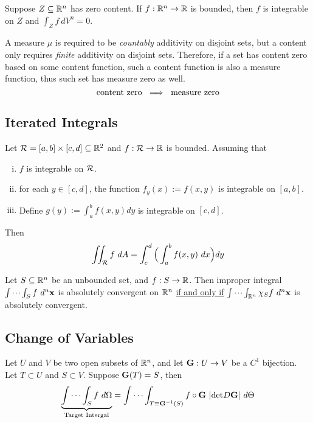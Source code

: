 \documentclass[11pt]{article}
\newcommand{\veG}[0]{\ve{G}}
\begin{document}
			\begin{proposition}[Folland 4.22]
				Suppose $Z \subseteq \mathbb{R}^n$ has zero content. If $f: \mathbb{R}^n \to \mathbb{R}$ is bounded, then $f$ is integrable on $Z$ and $\int_Z f\ dV^n = 0$.
			\end{proposition}
			
			\begin{remark}
				A measure $\mu$ is required to be \emph{countably} additivity on disjoint sets, but a content only requires \emph{finite} additivity on disjoint sets. Therefore, if a set has content zero based on some content function, such a content function is also a measure function, thus such set has measure zero as well.
				\begin{equation}
					\text{{content zero }} \implies \text{{ measure zero}}
				\end{equation}
			\end{remark}
			
		\subsection{Iterated Integrals}
			\begin{theorem}
				Let $\mathcal{{R}} = [a,b] \times [c,d] \subseteq \mathbb{R}^2$ and $f: \mathcal{{R}} \to \mathbb{R}$ is bounded. Assuming that
				\begin{enumerate}[(i)]
					\item $f$ is integrable on $\mathcal{{R}}$.
					\item for each $y \in [c,d]$, the function $f_y(x) := f(x,y)$ is integrable on $[a,b]$.
					\item Define $g(y) := \int_a^b f(x, y) dy$ is integrable on $[c,d]$.
				\end{enumerate}
				Then 
				\begin{equation}
					\iint_{\mathcal{{R}}} f\ dA = \int_c^d \Big ( \int_a^b f(x,y)\ dx\Big)dy
				\end{equation}
			\end{theorem}
		
		\begin{proposition}
			Let $S \subseteq \mathbb{R}^n$ be an unbounded set, and $f: S \to \mathbb{R}$.
			Then improper integral $\idotsint_{S} f\ d^n \textbf{x}$ is absolutely convergent on $\mathbb{R}^n$ \ul{if and only if} $\idotsint_{\mathbb{R}^n} \chi_S f\ d^n \textbf{x}$ is absolutely convergent.
		\end{proposition}
	
		\subsection{Change of Variables}
			\begin{theorem}
				Let $U$ and $V$ be two open subsets of $\mathbb{R}^n$, and let $\textbf{G}: U \to V$ be a $C^1$ bijection. Let $T \subset U$ and $S \subset V$. Suppose $\textbf{G}(T) = S$, then
				\begin{equation}
					\underbrace{\int \cdots \int_S f\ d\Omega}_{\tx{Target Intergal}} = \int \cdots \int_{T\equiv \veG^{-1}(S)} f\circ\ve{G}\ |\tx{det}D\ve{G}|\ d\Theta
				\end{equation}
			\end{theorem}
			
\end{document}
